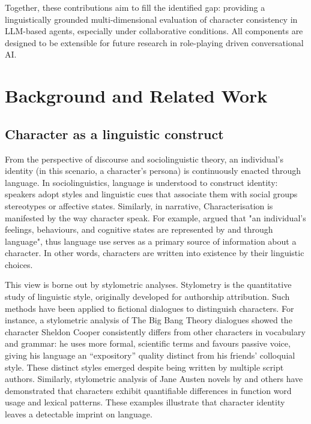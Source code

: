 \documentclass{article}
\begin{document}
Together, these contributions aim to fill the identified gap: providing a linguistically grounded multi-dimensional evaluation of character consistency in LLM-based agents, especially under collaborative conditions. All components are designed to be extensible for future research in role-playing driven conversational AI.

\section{Background and Related Work}

\subsection{Character as a linguistic construct}

From the perspective of discourse and sociolinguistic theory, an individual’s identity (in this scenario, a character’s persona) is continuously enacted through language. In sociolinguistics, language is understood to construct identity: speakers adopt styles and linguistic cues that associate them with social groups stereotypes or affective states. Similarly, in narrative, Characterisation is manifested by the way character speak. For example, \cite{culpeper2001language} argued that "an individual's feelings, behaviours, and cognitive states are represented by and through language", thus language use serves as a primary source of information about a character. In other words, characters are written into existence by their linguistic choices.

This view is borne out by stylometric analyses. Stylometry is the quantitative study of linguistic style, originally developed for authorship attribution. Such methods have been applied to fictional dialogues to distinguish characters. For instance, a stylometric analysis of The Big Bang Theory dialogues \citep{van2016stylometry} showed the character Sheldon Cooper consistently differs from other characters in vocabulary and grammar: he uses more formal, scientific terms and favours passive voice, giving his language an “expository” quality distinct from his friends’ colloquial style. These distinct styles emerged despite being written by multiple script authors. Similarly, stylometric analysis of Jane Austen novels by \cite{burrows1987computation} and others have demonstrated that characters exhibit quantifiable differences in function word usage and lexical patterns. These examples illustrate that character identity leaves a detectable imprint on language.
\end{document}
